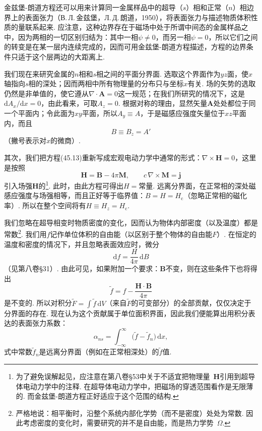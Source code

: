 金兹堡-朗道方程还可以用来计算同一金属样品中的超导（$s$）相和正常（$n$）相边界上的表面张力（В.\,Л.\,金兹堡，Л.\,Д.\,朗道，1950），将表面张力与描述物质体积性质的量联系起来. 应注意，这种边界存在于磁场中处于所谓中间态的金属样品之中，因为两相的一切区别归结为：其中一相$\psi\neq0$，而另一相$\psi=0$，所以它们之间的转变是在某一层内连续完成的，因而可用金兹堡-朗道方程描述，方程的边界条件只适于这个层两边的大距离上.

我们现在来研究金属的$n$相和$s$相之间的平面分界面. 选取这个界面作为$yz$面，使$x$轴指向$s$相的深处；因而两相中所有物理量的分布只与坐标$x$有关. 场的矢势的选取仍然是非单值的，使它遵从$\nabla\cdot\bm{A}=0$这一规范；在我们所研究的情况下，这是$\mathrm{d}A_x/\mathrm{d}x=0$，由此看来，可取$A_z=0$. 根据对称的理由，显然矢量$\bm{A}$处处都位于同一个平面内；令此面为$xy$平面，所以$A_y\equiv A$，于是磁感应强度矢量位于$xz$平面内，而且
\begin{equation}
B\equiv B_z=A'
\end{equation}
（撇号表示对$x$的微商）.

其次，我们把方程(45.13)重新写成宏观电动力学中通常的形式：$\nabla\times\bm{H}=0$，这里是按照
\begin{equation*}
\bm{H}=\bm{B}-4\pi\bm{M},\qquad c\,\nabla\times\bm{M}=\bm{j}
\end{equation*}
引入场强$\bm{H}$的\footnote{为了避免误解起见，应注意在第八卷§53中关于不适宜把物理量~$\bm H$引用到超导体电动力学中的注释. 在超导体电动力学中，把磁场的穿透范围看作是无限薄的. 而金兹堡-朗道方程正好适应于这个范围的结构.}. 此时，由此方程可得出$H=$常量. 远离分界面，在正常相的深处磁感应强度与场强相等，而且正好等于临界值：$B=H=H_{\mathrm{c}}$（忽略正常相的磁化率）. 所以在整个空间将有$H\equiv H_z=H_{\mathrm{c}}$.

我们忽略在超导相变时物质密度的变化，因而认为物体内部密度（以及温度）都是常数\footnote{严格地说：相平衡时，沿整个系统内部化学势（而不是密度）处处为常数. 因此考虑密度的变化时，需要研究的并不是自由能，而是热力学势~$\Omega$.}. 我们用$f$记作单位体积的自由能（以区别于整个物体的自由能$F$）. 在恒定的温度和密度的情况下，并且忽略表面效应时，微分
\begin{equation}
\mathrm{d}f=\frac{H}{4\pi}\,\mathrm{d}B
\end{equation}
（见第八卷§31）. 由此可见，如果附加一个要求：$\bm{B}$不变，则在这些条件下也将得出
\begin{equation}
\tilde{f}=f-\frac{\bm{H}\cdot\bm{B}}{4\pi}
\end{equation}
是不变的. 所以对积分$\tilde{F}=\int\tilde{f}\,\mathrm{d}V$（来自$\tilde{F}$的可变部分）的全部贡献，仅仅决定于分界面的存在. 现在认为这个贡献属于单位面积界面，因此我们便能算出用积分表达的表面张力系数：
\begin{equation}
\alpha_{ns}=\int_{-\infty}^{\infty}\bigl(\tilde{f}-\tilde{f}_n\bigr)\,\mathrm{d}x,
\end{equation}
式中常数$\tilde{f}_n$是远离分界面（例如在正常相深处）的$\tilde{f}$值.

